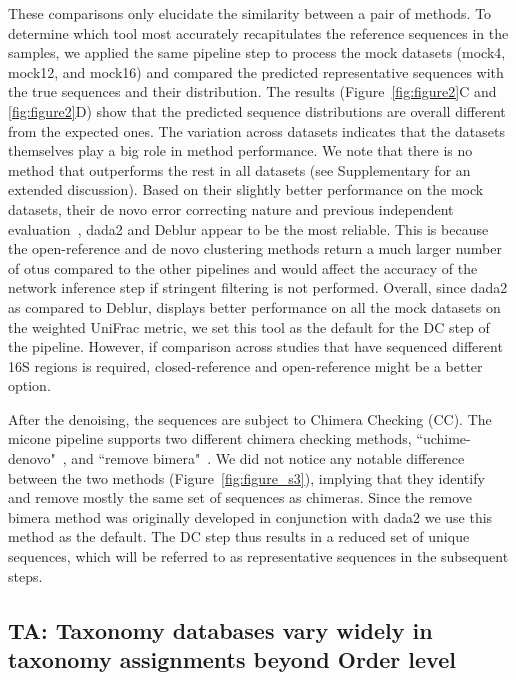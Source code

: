 \documentclass[letterpaper,12pt]{article}
\begin{document}
  These comparisons only elucidate the similarity between a pair of methods.
  To determine which tool most accurately recapitulates the reference sequences in the samples, we applied the same pipeline step to process the mock datasets (mock4, mock12, and mock16) and compared the predicted representative sequences with the true sequences and their distribution.
  The results (Figure~\ref{fig:figure2}C and \ref{fig:figure2}D) show that the predicted sequence distributions are overall different from the expected ones.
  The variation across datasets indicates that the datasets themselves play a big role in method performance.
  We note that there is no method that outperforms the rest in all datasets (see Supplementary for an extended discussion).
  Based on their slightly better performance on the mock datasets, their de novo error correcting nature and previous independent evaluation~\cite{Nearing2018}, \ac{dada2} and Deblur appear to be the most reliable.
  This is because the open-reference and de novo clustering methods return a much larger number of \ac{otu}s compared to the other pipelines and would affect the accuracy of the network inference step if stringent filtering is not performed.
  Overall, since \ac{dada2} as compared to Deblur, displays better performance on all the mock datasets on the weighted UniFrac metric, we set this tool as the default for the DC step of the pipeline.
  However, if comparison across studies that have sequenced different 16S regions is required, closed-reference and open-reference might be a better option.

  After the denoising, the sequences are subject to Chimera Checking (CC).
  The \ac{micone} pipeline supports two different chimera checking methods, ``uchime-denovo"~\cite{bolyenReproducibleInteractiveScalable2019}, and ``remove bimera"~\cite{Callahan2016}.
  We did not notice any notable difference between the two methods (Figure~\ref{fig:figure_s3}), implying that they identify and remove mostly the same set of sequences as chimeras.
  Since the remove bimera method was originally developed in conjunction with dada2 we use this method as the default.
  The DC step thus results in a reduced set of unique sequences, which will be referred to as representative sequences in the subsequent steps.

  \FloatBarrier

  \subsection*{TA: Taxonomy databases vary widely in taxonomy assignments beyond Order level}
\end{document}
